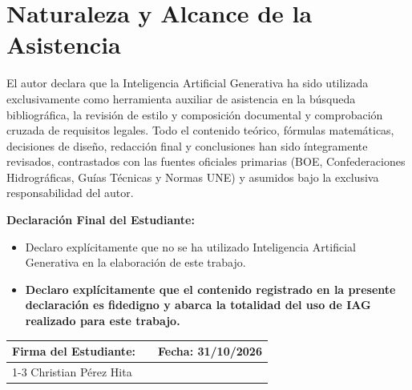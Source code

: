 \documentclass{report}
\begin{document}
\section*{Naturaleza y Alcance de la Asistencia}
El autor declara que la Inteligencia Artificial Generativa ha sido utilizada exclusivamente como herramienta auxiliar de asistencia en la búsqueda bibliográfica, la revisión de estilo y composición documental y comprobación cruzada de requisitos legales. Todo el contenido teórico, fórmulas matemáticas, decisiones de diseño, redacción final y conclusiones han sido íntegramente revisados, contrastados con las fuentes oficiales primarias (BOE, Confederaciones Hidrográficas, Guías Técnicas y Normas UNE) y asumidos bajo la exclusiva responsabilidad del autor.

\vspace{1.5em}
\noindent\textbf{Declaración Final del Estudiante:}
\begin{itemize}
    \item[$\square$] Declaro explícitamente que no se ha utilizado Inteligencia Artificial Generativa en la elaboración de este trabajo.
    \item[$\boxtimes$] \textbf{Declaro explícitamente que el contenido registrado en la presente declaración es fidedigno y abarca la totalidad del uso de IAG realizado para este trabajo.}
\end{itemize}

\vspace{2.5em}
\noindent\begin{tabularx}{\textwidth}{l X l}
\textbf{Firma del Estudiante:} & & \textbf{Fecha:} 31/10/2026 \\
\cline{1-3}
Christian Pérez Hita & & \\
\end{tabularx}

\newpage

\printbibliography[heading=bibintoc, title={Referencias Bibliográficas y Legislativas}]
\end{document}
